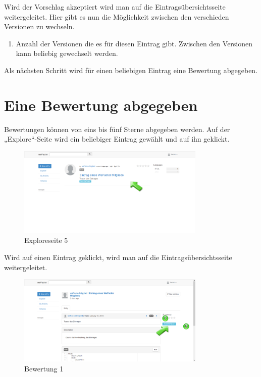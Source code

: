 Wird der Vorschlag akzeptiert wird man auf die Eintragsübersichtsseite weitergeleitet. Hier gibt es nun die Möglichkeit zwischen den verschieden Versionen zu wechseln.

\begin{enumerate}
\item Anzahl der Versionen die es für diesen Eintrag gibt. Zwischen den Versionen kann beliebig gewechselt werden.
\end{enumerate}


Als nächsten Schritt wird für einen beliebigen Eintrag eine Bewertung abgegeben.



\chapter{Eine Bewertung abgegeben}

Bewertungen können von eins bis fünf Sterne abgegeben werden.
Auf der „Explore“-Seite wird ein beliebiger Eintrag gewählt und auf ihn geklickt.

\begin{figure}[H]
    \centering
    \includegraphics[width=0.8\textwidth]{Bilder/40.png}
    \caption{Exploreseite 5 }
    \label{fig:exploreseite5}
\end{figure}


Wird auf einen Eintrag geklickt, wird man auf die Eintragsübersichtsseite weitergeleitet.

\begin{figure}[H]
    \centering
    \includegraphics[width=0.8\textwidth]{Bilder/41.png}
    \caption{Bewertung 1}
    \label{fig:bewertung1}
\end{figure}


